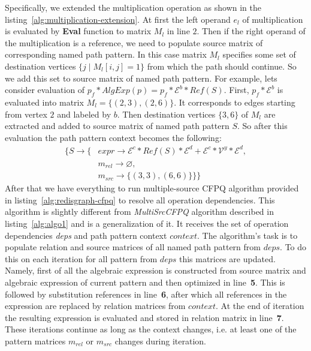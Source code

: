 Specifically, we extended the multiplication operation as shown in the listing~\autoref{alg:multiplication-extension}. At first the left operand $e_l$ of multiplication is evaluated by \textbf{Eval} function to matrix $M_l$ in line $2$. Then if the right operand of the multiplication is a reference, we need to populate source matrix of corresponding named path pattern. In this case matrix $M_l$ specifies some set of destination vertices $\{j \mid M_l[i,j] = 1\}$ from which the path should continue. So we add this set to source matrix of named path pattern. For example, lets consider evaluation of $p_f * AlgExp(p) = p_f * \mathcal{E}^b * Ref(S)$. First, $p_f * \mathcal{E}^b$ is evaluated into matrix $M_l = \{(2, 3), (2, 6)\}$. It corresponds to edges starting from vertex $2$ and labeled by $b$. Then destination vertices $\{3, 6\}$ of $M_l$ are extracted and added to source matrix of named path pattern $S$. So after this evaluation the path pattern context becomes the following:
\begin{align*}\label{example-path-pattern-context}
   \{ S  \xrightarrow{} \{ & expr \xrightarrow{} \mathcal{E}^c * Ref(S) * \mathcal{E}^d + \mathcal{E}^c * \mathcal{V}^y * \mathcal{E}^d, \\
                           & m_{rel} \xrightarrow{} \varnothing, \\
                           & m_{src} \xrightarrow{} \{(3, 3), (6, 6)\} \} \}
\end{align*}
After that we have everything to run multiple-source CFPQ algorithm provided in listing~\autoref{alg:redisgraph-cfpq} to resolve all operation dependencies. This algorithm is slightly different from \textit{MultiSrcCFPQ} algorithm described in listing~\autoref{alg:algo1} and is a generalization of it. It receives the set of operation dependencies \textit{deps} and path pattern context $context$. The algorithm's task is to populate relation and source matrices of all named path pattern from $deps$. To do this on each iteration for all pattern from $deps$ this matrices are updated. Namely, first of all the algebraic expression is constructed from source matrix and algebraic expression of current pattern and then optimized in line~\textbf{5}. This is followed by substitution references in line~\textbf{6}, after which all references in the expression are replaced by relation matrices from $context$. At the end of iteration the resulting expression is evaluated and stored in relation matrix in line~\textbf{7}. These iterations continue as long as the context changes, i.e. at least one of the pattern matrices $m_{rel}$ or $m_{src}$ changes during iteration.

